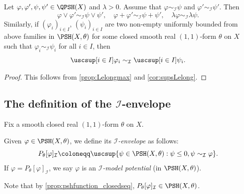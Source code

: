 \begin{proposition}\label{prop:Iequivmax}
    Let $\varphi,\varphi',\psi,\psi'\in \QPSH(X)$ and $\lambda>0$. Assume that $\varphi\sim_{\mathcal{I}}\psi$ and $\varphi'\sim_{\mathcal{I}}\psi'$. Then
    \[
        \varphi\lor \varphi'\sim_{\mathcal{I}} \psi\lor\psi',\quad \varphi+\varphi'\sim_{\mathcal{I}} \psi+\psi',\quad \lambda\varphi\sim_{\mathcal{I}}\lambda\psi.
    \]
    Similarly, if $(\varphi_i)_{i\in I}$, $(\psi_i)_{i\in I}$ are two non-empty uniformly bounded from above families in $\PSH(X,\theta)$ for some closed smooth real $(1,1)$-form $\theta$ on $X$ such that $\varphi_i\sim_{\mathcal{I}}\psi_i$ for all $i\in I$, then
    \[
    \uscsup[i\in I] \varphi_i\sim_{\mathcal{I}}\uscsup[i\in I] \psi_i.
    \]
\end{proposition}
\begin{proof}
    This follows from \cref{prop:Lelongmax} and \cref{cor:supsLelong}.
\end{proof}

\subsection{The definition of the \texorpdfstring{$\mathcal{I}$}{I}-envelope}
\label{subsec:Ienv_def}
Fix a smooth closed real $(1,1)$-form $\theta$ on $X$.
\begin{definition}\label{def:Ienv}
    Given $\varphi\in \PSH(X,\theta)$, we define its \emph{$\mathcal{I}$-envelope} as follows:
    \begin{equation}\label{eq:Ienvelopedef}
        P_{\theta}[\varphi]_{\mathcal{I}}\coloneqq \uscsup\{\psi\in \PSH(X,\theta): \psi\leq 0,\psi\sim_{\mathcal{I}} \varphi\}.
    \end{equation}
    If $\varphi=P_{\theta}[\varphi]_{\mathcal{I}}$, we say $\varphi$ is an \emph{$\mathcal{I}$-model potential} (in $\PSH(X,\theta)$).
\end{definition}
Note that by \cref{prop:pshfunction_closedseq}, $P_{\theta}[\varphi]_{\mathcal{I}}\in \PSH(X,\theta)$.

